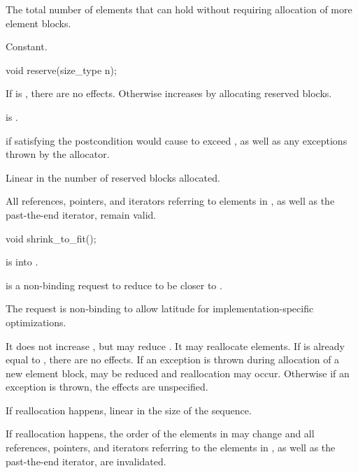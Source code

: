 \begin{itemdescr}
\pnum
\returns
The total number of elements that  can hold
without requiring allocation of more element blocks.

\pnum
\complexity
Constant.
\end{itemdescr}

%
\begin{itemdecl}
void reserve(size_type n);
\end{itemdecl}

\begin{itemdescr}
\pnum
\effects
If  is , there are no effects.
Otherwise increases  by allocating reserved blocks.

\pnum
\ensures
{} is .

\pnum
\throws
{} if
satisfying the postcondition
would cause  to exceed ,
as well as any exceptions thrown by the allocator.

\pnum
\complexity
Linear in the number of reserved blocks allocated.

\pnum
\remarks
All references, pointers, and iterators referring to elements in ,
as well as the past-the-end iterator, remain valid.
\end{itemdescr}

%
\begin{itemdecl}
void shrink_to_fit();
\end{itemdecl}

\begin{itemdescr}
\pnum
\expects
{} is  into .

\pnum
\effects
{} is a non-binding request
to reduce  to be closer to .
\begin{note}
The request is non-binding
to allow latitude for implementation-specific optimizations.
\end{note}
It does not increase , but may reduce .
It may reallocate elements.
If  is already equal to , there are no effects.
If an exception is thrown during allocation of a new element block,
 may be reduced and reallocation may occur.
Otherwise if an exception is thrown, the effects are unspecified.

\pnum
\complexity
If reallocation happens, linear in the size of the sequence.

\pnum
\remarks
If reallocation happens,
the order of the elements in  may change and
all references, pointers, and iterators
referring to the elements in ,
as well as the past-the-end iterator, are invalidated.
\end{itemdescr}

